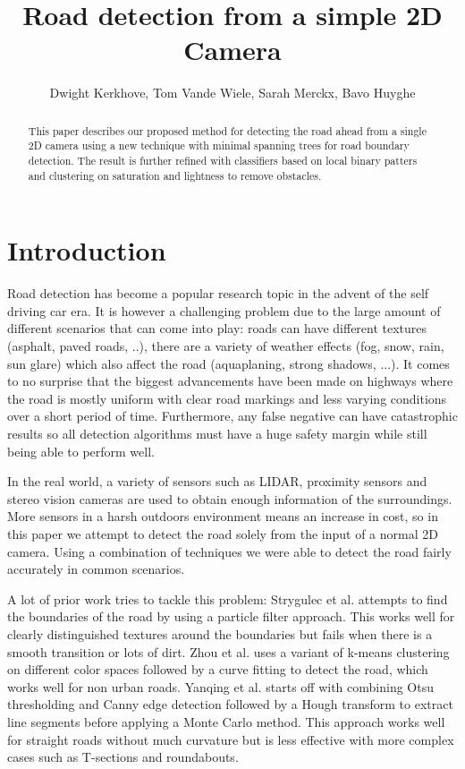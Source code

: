 \documentclass[oneside,english]{llncs}
\begin{document}
\title{Road detection from a simple 2D Camera}
\author{Dwight Kerkhove, Tom Vande Wiele, Sarah Merckx, Bavo Huyghe}

\maketitle

\begin{abstract}
This paper describes our proposed method for detecting the road ahead from a single 2D camera using a new technique with minimal spanning trees for road boundary detection. The result is further refined with classifiers based on local binary patters and clustering on saturation and lightness to remove obstacles.
\end{abstract}

\section{Introduction}

Road detection has become a popular research topic in the advent of the self driving car era. It is however a challenging problem due to the large amount of different scenarios that can come into play: roads can have different textures (asphalt, paved roads, ..), there are a variety of weather effects (fog, snow, rain, sun glare) which also affect the road (aquaplaning, strong shadows, ...). It comes to no surprise that the biggest advancements have been made on highways where the road is mostly uniform with clear road markings and less varying conditions over a short period of time. Furthermore, any false negative can have catastrophic results so all detection algorithms must have a huge safety margin while still being able to perform well.

In the real world, a variety of sensors such as LIDAR, proximity sensors and stereo vision cameras are used to obtain enough information of the surroundings. More sensors in a harsh outdoors environment means an increase in cost, so in this paper we attempt to detect the road solely from the input of a normal 2D camera. Using a combination of techniques we were able to detect the road fairly accurately in common scenarios.

A lot of prior work tries to tackle this problem: Strygulec et al. \cite{key-11} attempts to find the boundaries of the road by using a particle filter approach. This works well for clearly distinguished textures around the boundaries but fails when there is a smooth transition or lots of dirt. Zhou et al. \cite{key-12} uses a variant of k-means clustering on different color spaces followed by a curve fitting to detect the road, which works well for non urban roads. Yanqing et al. \cite{key-13} starts off with combining Otsu thresholding and Canny edge detection followed by a Hough transform to extract line segments before applying a Monte Carlo method. This approach works well for straight roads without much curvature but is less effective with more complex cases such as T-sections and roundabouts. 
\end{document}
